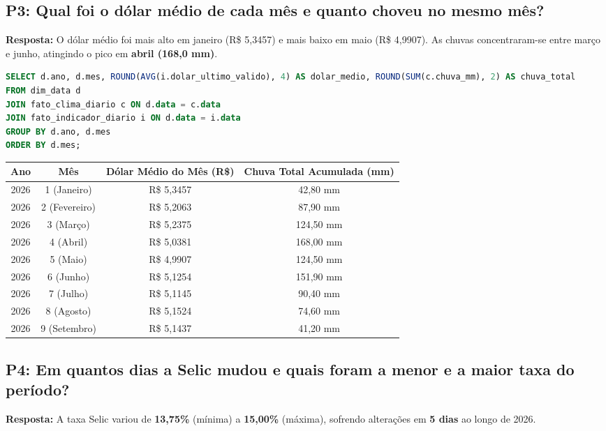 \documentclass[11pt,a4paper]{article}
\begin{document}
\subsection*{P3: Qual foi o dólar médio de cada mês e quanto choveu no mesmo mês?}
\noindent\textbf{Resposta:} O dólar médio foi mais alto em janeiro (R\$ 5,3457) e mais baixo em maio (R\$ 4,9907). As chuvas concentraram-se entre março e junho, atingindo o pico em \textbf{abril (168,0 mm)}.

\begin{lstlisting}[language=SQL]
SELECT d.ano, d.mes, ROUND(AVG(i.dolar_ultimo_valido), 4) AS dolar_medio, ROUND(SUM(c.chuva_mm), 2) AS chuva_total
FROM dim_data d
JOIN fato_clima_diario c ON d.data = c.data
JOIN fato_indicador_diario i ON d.data = i.data
GROUP BY d.ano, d.mes
ORDER BY d.mes;
\end{lstlisting}

\begin{table}[h!]
\centering
\small
\begin{tabular}{cccc}
\toprule
\textbf{Ano} & \textbf{Mês} & \textbf{Dólar Médio do Mês (R\$)} & \textbf{Chuva Total Acumulada (mm)} \\
\midrule
2026 & 1 (Janeiro) & R\$ 5,3457 & 42,80 mm \\
2026 & 2 (Fevereiro) & R\$ 5,2063 & 87,90 mm \\
2026 & 3 (Março) & R\$ 5,2375 & 124,50 mm \\
2026 & 4 (Abril) & R\$ 5,0381 & 168,00 mm \\
2026 & 5 (Maio) & R\$ 4,9907 & 124,50 mm \\
2026 & 6 (Junho) & R\$ 5,1254 & 151,90 mm \\
2026 & 7 (Julho) & R\$ 5,1145 & 90,40 mm \\
2026 & 8 (Agosto) & R\$ 5,1524 & 74,60 mm \\
2026 & 9 (Setembro) & R\$ 5,1437 & 41,20 mm \\
\bottomrule
\end{tabular}
\end{table}

\subsection*{P4: Em quantos dias a Selic mudou e quais foram a menor e a maior taxa do período?}
\noindent\textbf{Resposta:} A taxa Selic variou de \textbf{13,75\%} (mínima) a \textbf{15,00\%} (máxima), sofrendo alterações em \textbf{5 dias} ao longo de 2026.
\end{document}
